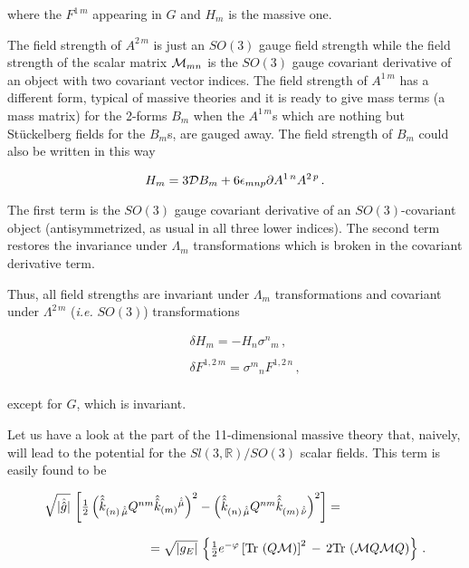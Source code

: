 \documentclass[12pt,a4paper]{article}
\begin{document}
\noindent where the $F^{1\, m}$ appearing in $G$ and $H_{m}$ is the 
massive one.

The field strength of $A^{2\, m}$ is just an $SO(3)$ gauge field
strength while the field strength of the scalar matrix ${\cal M}_{mn}$
is the $SO(3)$ gauge covariant derivative of an object with two
covariant vector indices. The field strength of $A^{1\, m}$ has a
different form, typical of massive theories and it is ready to give
mass terms (a mass matrix) for the 2-forms $B_{m}$ when the $A^{1\,
  m}$s which are nothing but St\"uckelberg fields for the $B_{m}$s,
are gauged away. The field strength of $B_{m}$ could also be written
in this way

\begin{equation}
H_{m} = 3{\cal D} B_{m} +6\epsilon_{mnp}\partial A^{1\, n}A^{2\, p}\, .
\end{equation}

\noindent The first term is the $SO(3)$ gauge covariant derivative
of an $SO(3)$-covariant object (antisymmetrized, as usual in all three
lower indices). The second term restores the invariance under
$\Lambda_{m}$ transformations which is broken in the covariant
derivative term.

Thus, all field strengths are invariant under $\Lambda_{m}$
transformations and covariant under $\Lambda^{2\, m}$ ({\em i.e.}
$SO(3)$) transformations

\begin{equation}
\begin{array}{rcl}
& & \delta H_{m} =  -H_{n}\sigma^{n}{}_{m}\, ,\\
& & \\
& & \delta F^{1,2\, m} = \sigma^{m}{}_{n} F^{1,2\, n}\, ,\\
\end{array}
\end{equation}

\noindent except for $G$, which is invariant.

Let us have a look at the part of the 11-dimensional massive theory
that, naively, will lead to the potential for the
$Sl(3,\mathbb{R})/SO(3)$ scalar fields.  This term is easily found to
be

\begin{equation}
  \begin{array}{rcl}
\sqrt{|\hat{\hat{g}}|}\,\left[
  \textstyle{\frac{1}{2}}
\left(\hat{\hat{k}}_{(n)\, \hat{\hat{\mu}}}
Q^{nm} \hat{\hat{k}}_{(m)}{}^{\hat{\hat{\mu}}}\right)^{2}
-\left(\hat{\hat{k}}_{(n)\, \hat{\hat{\mu}}}
Q^{nm}\hat{\hat{k}}_{(m)\, \hat{\hat{\nu}}}\right)^{2}
\right]= 
& & \\
& & \\
& & 
\hspace{-6cm}
=\sqrt{|g_{E}|}\, \left\{ 
\textstyle{\frac{1}{2}}e^{-\varphi}
\left[{\rm Tr}\,\left( Q\mathcal{M}\right)
    \right]^{2}
    \,-\, 
   2{\rm Tr}\, \left( 
          \mathcal{M}Q\mathcal{M}Q
      \right)
  \right\}\, .\\
\end{array}
\label{eq:Potential1}
\end{equation}
\end{document}

